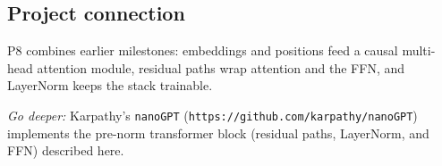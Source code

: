 \subsection*{Project connection}
P8 combines earlier milestones: embeddings and positions feed a causal
multi-head attention module, residual paths wrap attention and the FFN, and
LayerNorm keeps the stack trainable.

\medskip
\noindent\textit{Go deeper:} Karpathy's \texttt{nanoGPT}
(\texttt{https://github.com/karpathy/nanoGPT}) implements the pre-norm
transformer block (residual paths, LayerNorm, and FFN) described here.
